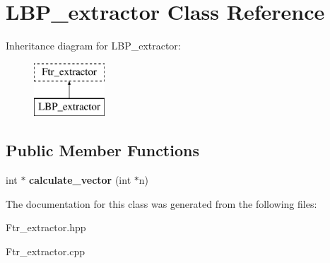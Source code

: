 \hypertarget{class_l_b_p__extractor}{\section{L\+B\+P\+\_\+extractor Class Reference}
\label{class_l_b_p__extractor}
}
Inheritance diagram for L\+B\+P\+\_\+extractor\+:\begin{figure}[H]
\begin{center}
\leavevmode
\includegraphics[height=2.000000cm]{class_l_b_p__extractor}
\end{center}
\end{figure}
\subsection*{Public Member Functions}
\begin{DoxyCompactItemize}
\item 
\hypertarget{class_l_b_p__extractor_a606547f32a488bc9f3d501c709bd116c}{int $\ast$ {\bfseries calculate\+\_\+vector} (int $\ast$n)}\label{class_l_b_p__extractor_a606547f32a488bc9f3d501c709bd116c}

\end{DoxyCompactItemize}


The documentation for this class was generated from the following files\+:\begin{DoxyCompactItemize}
\item 
Ftr\+\_\+extractor.\+hpp\item 
Ftr\+\_\+extractor.\+cpp\end{DoxyCompactItemize}
